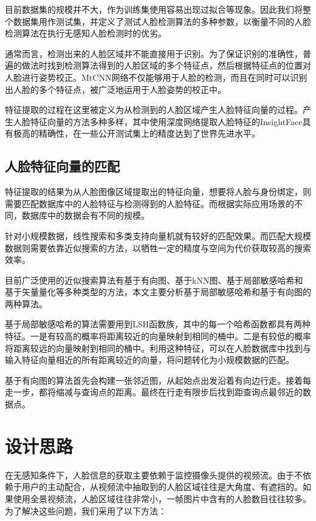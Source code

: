 目前数据集的规模并不大，作为训练集使用容易出现过拟合等现象。因此我们将整个数据集用作测试集，并定义了测试人脸检测算法的多种参数，以衡量不同的人脸检测算法在执行无感知人脸检测时的优劣。

通常而言，检测出来的人脸区域并不能直接用于识别。为了保证识别的准确性，普遍的做法时找到检测算法得到的人脸区域的多个特征点，然后根据特征点的位置对人脸进行姿势校正。MtCNN网络\cite{zhang2016joint}不仅能够用于人脸的检测，而且在同时可以识别出人脸的多个特征点，被广泛地运用于人脸姿势的校正中。

特征提取的过程在这里被定义为从检测到的人脸区域产生人脸特征向量的过程。产生人脸特征向量的方法多种多样，其中使用深度网络提取人脸特征的InsightFace\cite{deng2018arcface}具有极高的精确性，在一些公开测试集上的精度达到了世界先进水平。

\subsection{人脸特征向量的匹配}

特征提取的结果为从人脸图像区域提取出的特征向量，想要将人脸与身份绑定，则需要匹配数据库中的人脸特征与检测得到的人脸特征。而根据实际应用场景的不同，数据库中的数据会有不同的规模。

针对小规模数据，线性搜索和多类支持向量机就有较好的匹配效果。而匹配大规模数据则需要依靠近似搜索的方法，以牺牲一定的精度与空间为代价获取较高的搜索效率。

目前广泛使用的近似搜索算法有基于有向图、基于kNN图、基于局部敏感哈希和基于矢量量化等多种类型的方法，本文主要分析基于局部敏感哈希和基于有向图的两种算法。

基于局部敏感哈希的算法需要用到LSH函数族，其中的每一个哈希函数都具有两种特征。一是有较高的概率将距离较近的向量映射到相同的桶中。二是有较低的概率将距离较远的向量映射到相同的桶中。利用这种特征，可以在人脸数据库中找到与输入特征向量相近的所有距离较近的向量，将问题转化为小规模数据的匹配。

基于有向图的算法首先会构建一张邻近图，从起始点出发沿着有向边行走。接着每走一步，都将缩减与查询点的距离。最终在行走有限步后找到距查询点最邻近的数据点。

\section{设计思路}

在无感知条件下，人脸信息的获取主要依赖于监控摄像头提供的视频流。由于不依赖于用户的主动配合，从视频流中抽取到的人脸区域往往是大角度、有遮挡的。如果使用全景视频流，人脸区域往往非常小，一帧图片中含有的人脸数目往往较多。为了解决这些问题，我们采用了以下方法：

